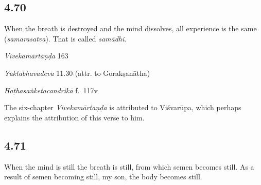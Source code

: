 \begin{ekdosis}

\subsection*{4.70}
\begin{translation}[hp04_070]
When the breath is destroyed and the mind dissolves, all experience is the same (\emph{samarasatva}). That is called \emph{samādhi}.
\end{translation}

\begin{sources}[hp04_070]
\emph{Vivekamārtaṇḍa} 163
\begin{versinnote}
\end{versinnote}
\end{sources}

\begin{testimonia}[hp04_070]
\emph{Yuktabhavadeva} 11.30 (attr. to Gorakṣanātha)
\begin{versinnote}
\tl{\var{yadā ] tadā}\\!}
\end{versinnote}

\emph{Haṭhasaṅketacandrikā} f.~117v
\begin{versinnote}
\tl{\var{mānasaṃ ca ] B220, mānaseva 2244}\\!}
\end{versinnote}
\end{testimonia}

\begin{philcomm}[hp04_070]
The six-chapter \emph{Vivekamārtaṇḍa} is attributed to Viśvarūpa, which perhaps explains the attribution of this verse to him.
\end{philcomm}

\subsection*{4.71}
\begin{translation}[hp04_071]
When the mind is still the breath is still, from which semen becomes still.  As a result of semen becoming still, my son, the body becomes still.
\end{translation}


\end{ekdosis}

